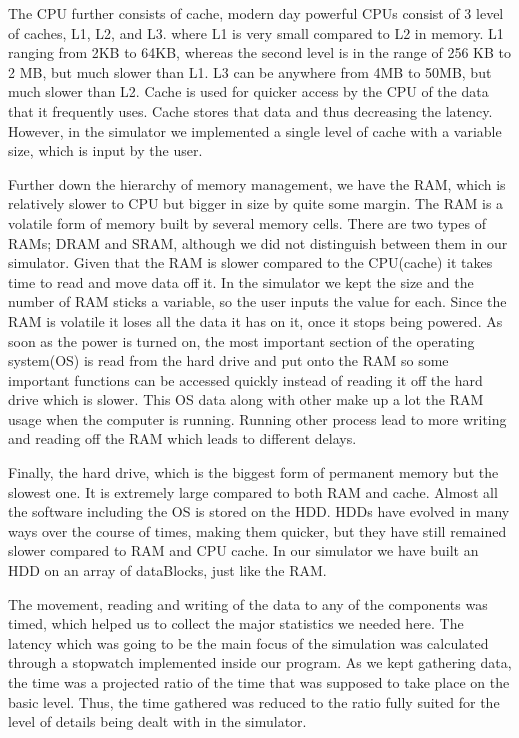 \documentclass[12pt]{article}
\begin{document}
The CPU further consists of cache, modern day powerful CPUs consist of 3 level of caches, L1, L2, and L3.
where L1 is very small compared to L2 in memory. L1 ranging from 2KB to 64KB, whereas the second level
is in the range of 256 KB to 2 MB, but much slower than L1. L3 can be anywhere from 4MB to 50MB, but much slower than L2.\cite{makeuseof}
Cache is used for quicker access by the CPU of the data that it
frequently uses. Cache stores that data and thus decreasing the latency. However, in the simulator we
implemented a single level of cache with a variable size, which is input by the user.

Further down the hierarchy of memory management, we have the RAM, which is relatively slower to CPU but bigger
in size by quite some margin. The RAM is a volatile form of memory
built by several memory cells. There are two types of RAMs; DRAM and SRAM, although we did not distinguish
between them in our simulator. Given that the RAM is slower compared to the CPU(cache) it takes time to read
and move data off it. In the simulator we kept the size and the number of RAM sticks a variable, so
the user inputs the value for each. Since the RAM is volatile it loses all the data it has on it, once it
stops being powered. As soon as the power is turned on, the most important section of the operating system(OS) is read from
the hard drive and put onto the RAM so some important functions can be accessed quickly instead of reading
it off the hard drive which is slower. This OS data along with other make up a lot the RAM usage when the
computer is running. Running other process lead to more writing and reading off the RAM which leads to different
delays.

Finally, the hard drive, which is the biggest form of permanent memory but the slowest one. It is
extremely large compared to both RAM and cache. Almost all the software including the OS is stored on
the HDD. HDDs have evolved in many ways over the course of times, making them quicker, but they have
still remained slower compared to RAM and CPU cache. In our simulator we have built an HDD on an array of dataBlocks,
just like the RAM.

The movement, reading and writing of the data to any of the components was timed, which helped
us to  collect the major statistics we needed here. The latency which was going to be the
main focus of the simulation was calculated through a stopwatch implemented
inside our program. As we kept gathering data, the time was a projected ratio of the time that was supposed to
take place on the basic level. Thus, the time gathered was reduced to the ratio fully suited for the
level of details being dealt with in the simulator.
\end{document}
